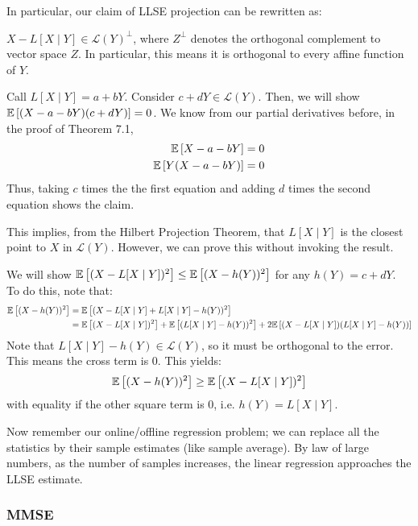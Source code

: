 In particular, our claim of LLSE projection can be rewritten as:

\begin{theorem}
    $X - L[X \mid Y] \in \mathcal{L}(Y)^{\perp}$, where $Z^\perp$ denotes the orthogonal complement to vector space $Z$. In particular, this means it is orthogonal
    to every affine function of $Y$.

    \begin{proof*}
        Call $L[X \mid Y] = a + bY$. Consider $c + dY \in \mathcal{L}(Y)$. Then, we will show $\mathbb{E}\left[ (X - a - bY)(c + dY) \right] = 0$.
        We know from our partial derivatives before, in the proof of Theorem 7.1,
        \begin{align*}
            \mathbb{E}\left[ X - a - bY \right] &= 0 \\
            \mathbb{E}\left[ Y(X - a - bY) \right] &= 0
        \end{align*}
        Thus, taking $c$ times the the first equation and adding $d$ times the second equation shows the claim.
    \end{proof*}
\end{theorem}


This implies, from the Hilbert Projection Theorem, that $L[X \mid Y]$ is the closest point to $X$ in $\mathcal{L}(Y)$. However, we can prove this
without invoking the result.

\begin{proof*}
    We will show $\mathbb{E}\left[ (X - L[X \mid Y])^2 \right] \leq \mathbb{E}\left[ (X - h(Y))^2 \right]$ for any $h(Y) = c + dY$. To do this, note that:
    \begin{align*}
        \mathbb{E}\left[ (X - h(Y))^2 \right] &= \mathbb{E}\left[ (X - L[X\mid Y] + L[X \mid Y] - h(Y))^2 \right] \\
        &= \mathbb{E}\left[ (X - L[X \mid Y])^2 \right] + \mathbb{E}\left[ (L[X \mid Y] - h(Y))^2 \right] + 2 \mathbb{E}\left[ (X - L[X \mid Y])(L[X \mid Y] - h(Y)) \right]
    \end{align*}
    Note that $L[X \mid Y] - h(Y) \in \mathcal{L}(Y)$, so it must be orthogonal to the error. This means the cross term is 0. This yields:
    \[ \mathbb{E}\left[ (X - h(Y))^2 \right] \geq \mathbb{E}\left[ (X - L[X \mid Y])^2 \right] \]
    with equality if the other square term is 0, i.e. $h(Y) = L[X \mid Y]$.
\end{proof*}

Now remember our online/offline regression problem; we can replace all the statistics by their sample estimates (like sample average). By law of large numbers,
as the number of samples increases, the linear regression approaches the LLSE estimate.

\subsubsection{MMSE}

